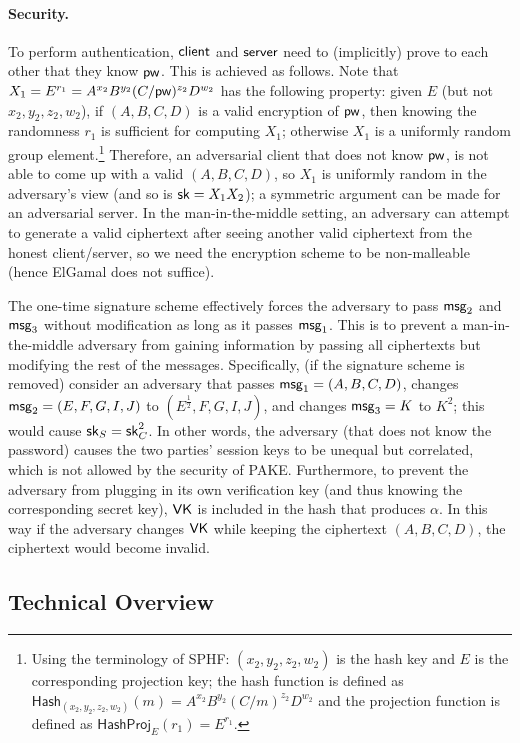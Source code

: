 \paragraph{Security.}
To perform authentication, $\mathsf{client}$ and $\mathsf{server}$ need to (implicitly) prove to each other that they know $\mathsf{pw}$. This is achieved as follows. Note that $X_1 = E^{r_1} = A^{x_2}B^{y_2}(C/\mathsf{pw})^{z_2}D^{w_2}$ has the following property: given $E$ (but not $x_2,y_2,z_2,w_2$), if $(A,B,C,D)$ is a valid encryption of $\mathsf{pw}$, then knowing the randomness $r_1$ is sufficient for computing $X_1$; otherwise $X_1$ is a uniformly random group element.\footnote{Using the terminology of SPHF: $(x_2,y_2,z_2,w_2)$ is the hash key and $E$ is the corresponding projection key; the hash function is defined as $\mathsf{Hash}_{(x_2,y_2,z_2,w_2)}(m) = A^{x_2}B^{y_2}(C/m)^{z_2}D^{w_2}$ and the projection function is defined as $\mathsf{HashProj}_E(r_1) = E^{r_1}$.} Therefore, an adversarial client that does not know $\mathsf{pw}$, is not able to come up with a valid $(A,B,C,D)$, so $X_1$ is uniformly random in the adversary's view (and so is $\mathsf{sk} = X_1X_2$); a symmetric argument can be made for an adversarial server. In the man-in-the-middle setting, an adversary can attempt to generate a valid ciphertext after seeing another valid ciphertext from the honest client/server, so we need the encryption scheme to be non-malleable (hence ElGamal does not suffice).

The one-time signature scheme effectively forces the adversary to pass $\mathsf{msg}_{2}$ and $\mathsf{msg}_{3}$ without modification as long as it passes $\mathsf{msg}_{1}$. This is to prevent a man-in-the-middle adversary from gaining information by passing all ciphertexts but modifying the rest of the messages. Specifically, (if the signature scheme is removed) consider an adversary that passes $\mathsf{msg}_{1} = (A,B,C,D)$, changes $\mathsf{msg}_{2} = (E,F,G,I,J)$ to $(E^{\frac{1}{2}},F,G,I,J)$, and changes $\mathsf{msg}_{3} = K$ to $K^2$; this would cause $\mathsf{sk}_S = \mathsf{sk}_C^2$. In other words, the adversary (that does not know the password) causes the two parties' session keys to be unequal but correlated, which is not allowed by the security of PAKE. Furthermore, to prevent the adversary from plugging in its own verification key (and thus knowing the corresponding secret key), $\mathsf{VK}$ is included in the hash that produces $\alpha$. In this way if the adversary changes $\mathsf{VK}$ while keeping the ciphertext $(A,B,C,D)$, the ciphertext would become invalid.

\subsection{Technical Overview}

